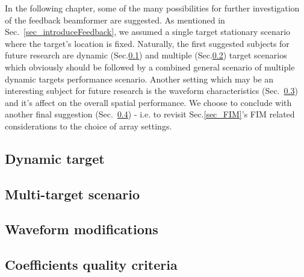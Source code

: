 In the following chapter, some of the many possibilities for further investigation of the feedback beamformer are suggested.
As mentioned in Sec.~\ref{sec_introduceFeedback}, we assumed a single target stationary scenario where the target's location is fixed.
Naturally, the first suggested subjects for future research are dynamic (Sec.\ref{sec_future_dynamic}) and multiple (Sec.\ref{sec_future_multiTarget}) target scenarios which obviously should be followed by a combined general scenario of multiple dynamic targets performance scenario.
Another setting which may be an interesting subject for future research is the waveform characteristics (Sec.~\ref{sec_future_wavfrom}) and it's affect on the overall spatial performance.
We choose to conclude with another final suggestion (Sec.~\ref{sec_future_coef}) - i.e. to revisit Sec.\ref{sec_FIM}'s FIM related considerations to the choice of array settings. 
\subsection{Dynamic target}
\label{sec_future_dynamic}

\subsection{Multi-target scenario}
\label{sec_future_multiTarget}

\subsection{Waveform modifications}
\label{sec_future_wavfrom}

\subsection{Coefficients quality criteria}
\label{sec_future_coef}

% 